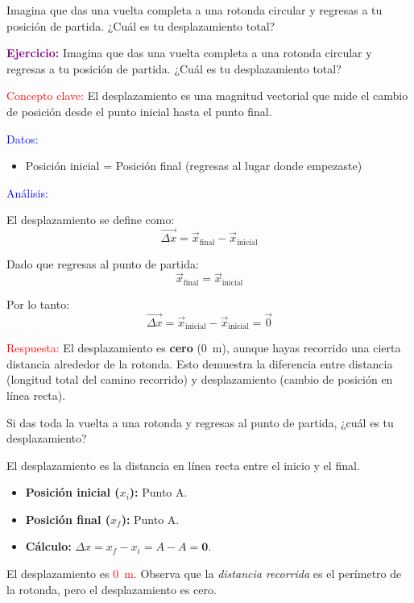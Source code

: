 \begin{exercise}
    Imagina que das una vuelta completa a una rotonda circular y regresas a tu posición de partida. ¿Cuál es tu desplazamiento total?
    \begin{solu}
        \textbf{\textcolor{purple}{Ejercicio:}} Imagina que das una vuelta completa a una rotonda circular y regresas a tu posición de partida. ¿Cuál es tu desplazamiento total?

        \vspace{0.3cm}

        \textcolor{red}{Concepto clave:} El desplazamiento es una magnitud vectorial que mide el cambio de posición desde el punto inicial hasta el punto final.

        \textcolor{blue}{Datos:}
        \begin{itemize}
            \item Posición inicial = Posición final (regresas al lugar donde empezaste)
        \end{itemize}

        \textcolor{blue}{Análisis:}

        El desplazamiento se define como:
        \[
            \vec{\Delta x} = \vec{x}_{\text{final}} - \vec{x}_{\text{inicial}}
        \]

        Dado que regresas al punto de partida:
        \[
            \vec{x}_{\text{final}} = \vec{x}_{\text{inicial}}
        \]

        Por lo tanto:
        \[
            \vec{\Delta x} = \vec{x}_{\text{inicial}} - \vec{x}_{\text{inicial}} = \vec{0}
        \]

        \textcolor{red}{Respuesta:} El desplazamiento es \textbf{cero} (\qty{0}{\m}), aunque hayas recorrido una cierta distancia alrededor de la rotonda. Esto demuestra la diferencia entre distancia (longitud total del camino recorrido) y desplazamiento (cambio de posición en línea recta).
    \end{solu}
\end{exercise}

\begin{exercise}
    Si das toda la vuelta a una rotonda y regresas al punto de partida, ¿cuál es tu desplazamiento?
    \begin{solu}
        El desplazamiento es la distancia en línea recta entre el inicio y el final.
        \begin{itemize}
            \item \textbf{Posición inicial ($x_i$):} Punto A.
            \item \textbf{Posición final ($x_f$):} Punto A.
            \item \textbf{Cálculo:} $\Delta x = x_f - x_i = A - A = \mathbf{0}$.
        \end{itemize}
        El desplazamiento es \textcolor{red}{\qty{0}{\m}}. Observa que la \textit{distancia recorrida} es el perímetro de la rotonda, pero el desplazamiento es cero.
    \end{solu}
\end{exercise}


